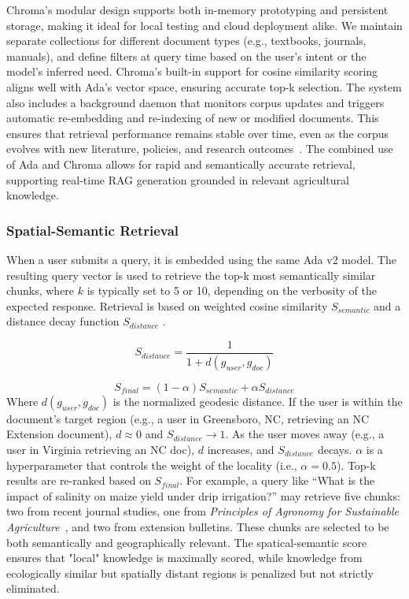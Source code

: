 \documentclass{ieeeaccess}
\begin{document}
Chroma's modular design supports both in-memory prototyping and persistent storage, making it ideal for local testing and cloud deployment alike. We maintain separate collections for different document types (e.g., textbooks, journals, manuals), and define filters at query time based on the user’s intent or the model’s inferred need. Chroma's built-in support for cosine similarity scoring aligns well with Ada's vector space, ensuring accurate top-k selection. The system also includes a background daemon that monitors corpus updates and triggers automatic re-embedding and re-indexing of new or modified documents. This ensures that retrieval performance remains stable over time, even as the corpus evolves with new literature, policies, and research outcomes~\cite{karpukhin2020dpr}. The combined use of Ada and Chroma allows for rapid and semantically accurate retrieval, supporting real-time RAG generation grounded in relevant agricultural knowledge.

\subsubsection{Spatial-Semantic Retrieval}

When a user submits a query, it is embedded using the same Ada v2 model. The resulting query vector is used to retrieve the top-k most semantically similar chunks, where \(k\) is typically set to 5 or 10, depending on the verbosity of the expected response. Retrieval is based on weighted cosine similarity $S_{semantic}$ and a distance decay function $S_{distance}$ \cite{yu2025spatial}. 

\begin{equation}
    S_{distance} = \frac{1}{1 + d (g_{user}, g_{doc})}
\end{equation}

\begin{equation}
    S_{final} = (1-\alpha) S_{semantic} + \alpha S_{distance}
\end{equation}
Where $d(g_{user}, g_{doc})$ is the normalized geodesic distance.
If the user is within the document's target region (e.g., a user in Greensboro, NC, retrieving an NC Extension document), $d \approx 0$ and $S_{distance} \rightarrow 1$.
As the user moves away (e.g., a user in Virginia retrieving an NC doc), $d$ increases, and $S_{distance}$ decays.
$\alpha$ is a hyperparameter that controls the weight of the locality (i.e., $\alpha = 0.5$). Top-k results are re-ranked based on $S_{final}$. For example, a query like ``What is the impact of salinity on maize yield under drip irrigation?'' may retrieve five chunks: two from recent journal studies, one from \textit{Principles of Agronomy for Sustainable Agriculture}~\cite{reddyagronomy}, and two from extension bulletins. These chunks are selected to be both semantically and geographically relevant. The spatical-semantic score ensures that "local" knowledge is maximally scored, while knowledge from ecologically similar but spatially distant regions is penalized but not strictly eliminated.
\end{document}
